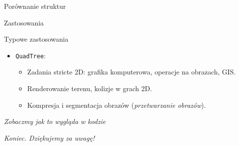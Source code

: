 \documentclass[aspectratio=1610, polish]{beamer}
\begin{document}
\begin{section}{Porównanie struktur}
\begin{frame}{Zastosowania}
\begin{block}{Typowe zastosowania}
\begin{itemize}
        \item \texttt{QuadTree}:
            \begin{itemize}
                \item Zadania stricte 2D: grafika komputerowa, operacje na obrazach, GIS.
                \item Renderowanie terenu, kolizje w grach 2D.
                \item Kompresja i segmentacja obrazów (\emph{przetwarzanie obrazów}).
            \end{itemize}
    \end{itemize}
    \end{block}
\end{frame}
    \begin{frame}{}
      \centering \Large
      \emph{Zobaczmy jak to wygląda w kodzie}
    \end{frame}
\end{section}

\begin{frame}{}
  \centering \Huge
  \emph{Koniec. Dziękujemy za uwagę!}
\end{frame}
\end{document}
